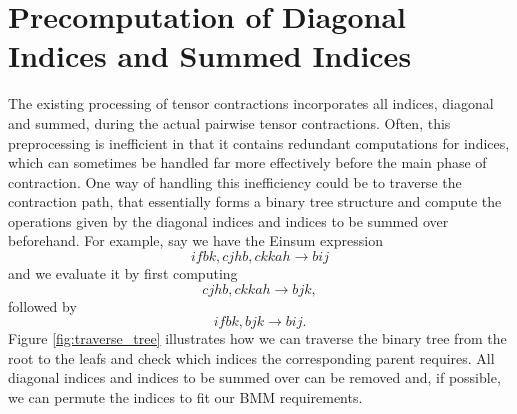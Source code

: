 \section{Precomputation of Diagonal Indices and Summed Indices}
The existing processing of tensor contractions incorporates all indices, diagonal and summed,
during the actual pairwise tensor contractions. Often, this preprocessing is inefficient in
that it contains redundant computations for indices, which can sometimes be handled far more
effectively before the main phase of contraction. One way of handling this inefficiency could
be to traverse the contraction path, that essentially forms a binary tree structure and compute
the operations given by the diagonal indices and indices to be summed over beforehand. For example,
say we have the Einsum expression
\begin{equation*}
    ifbk, cjhb, ckkah \rightarrow bij
\end{equation*}
and we evaluate it by first computing
\begin{equation*}
    cjhb, ckkah \rightarrow bjk,
\end{equation*}
followed by
\begin{equation*}
    ifbk, bjk \rightarrow bij.
\end{equation*}
Figure \ref{fig:traverse_tree} illustrates how we can traverse the binary tree from the root to the leafs and
check which indices the corresponding parent requires. All diagonal indices and indices to be
summed over can be removed and, if possible, we can permute the indices to fit our BMM requirements.
\\
\\

